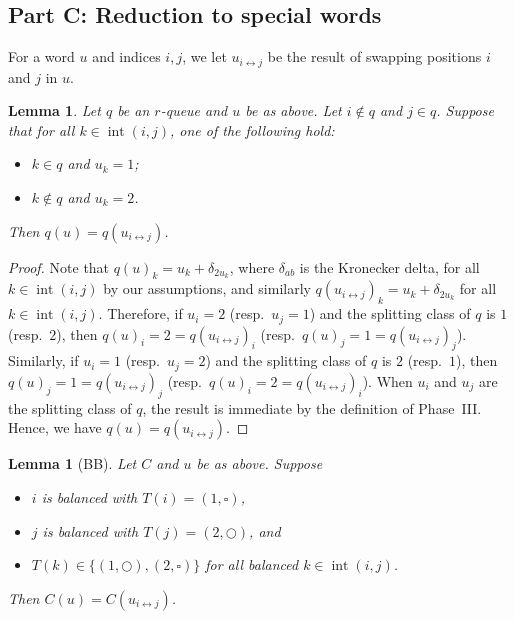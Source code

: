 \documentclass[reqno]{amsart}
\newcommand{\0}{\phantom{c}}
\DeclareMathOperator{\inter}{int} %
\theoremstyle{plain}
\newtheorem{lemma}[thm]{Lemma}
\theoremstyle{definition}
\numberwithin{equation}{section}
\begin{document}
\subsection*{Part C: Reduction to special words}

For a word $u$ and indices $i,j$, we let $u_{i\leftrightarrow j}$ be the result of swapping positions $i$ and $j$ in $u$.

\begin{lemma}
\label{le:orig}
  Let $q$ be an $r$-queue and $u$ be as above.
  Let $i \notin q$ and $j \in q$.
  Suppose that for all $k \in \inter(i,j)$, one of the following hold:
  \begin{itemize}
    \item $k \in q$ and $u_k=1$;
    \item $k \notin q$ and $u_k = 2$.
  \end{itemize}
  Then $q(u) = q(u_{i\leftrightarrow j})$.
\end{lemma}

\begin{proof}
Note that $q(u)_k = u_k + \delta_{2u_k}$, where $\delta_{ab}$ is the Kronecker delta, for all $k \in \inter(i,j)$ by our assumptions, and similarly $q(u_{i \leftrightarrow j})_k = u_k + \delta_{2u_k}$ for all $k \in \inter(i,j)$.
Therefore, if $u_i = 2$ (resp.~$u_j = 1$) and the splitting class of $q$ is $1$ (resp.~$2$), then $q(u)_i = 2 = q(u_{i \leftrightarrow j})_i$ (resp.~$q(u)_j = 1 = q(u_{i \leftrightarrow j})_j$).
Similarly, if $u_i = 1$ (resp.~$u_j = 2$) and the splitting class of $q$ is $2$ (resp.~$1$), then $q(u)_j = 1 = q(u_{i \leftrightarrow j})_j$ (resp.~$q(u)_i = 2 = q(u_{i \leftrightarrow j})_i$).
When $u_i$ and $u_j$ are the splitting class of $q$, the result is immediate by the definition of Phase~III.
Hence, we have $q(u) = q(u_{i \leftrightarrow j})$.
\end{proof}

\begin{lemma}[BB]
\label{le:BB}
  Let $C$ and $u$ be as above.
  Suppose
  \begin{itemize}
    \item $i$ is balanced with $T(i) = (1,\square)$,
    \item $j$ is balanced with $T(j) = (2,\bigcirc)$, and
    \item $T(k) \in \{(1,\bigcirc),(2,\square)\}$ for all balanced $k\in\inter(i,j)$.
  \end{itemize}
  Then $C(u) = C(u_{i \leftrightarrow j})$.
\end{lemma}
\end{document}
